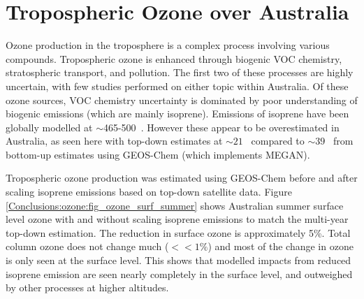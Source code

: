 \section{Tropospheric Ozone over Australia}
\label{Conclusions:ozone}
  
  Ozone production in the troposphere is a complex process involving various compounds.
  Tropospheric ozone is enhanced through biogenic VOC chemistry, stratospheric transport, and pollution.
  The first two of these processes are highly uncertain, with few studies performed on either topic within Australia.
  Of these ozone sources, VOC chemistry uncertainty is dominated by poor understanding of biogenic emissions (which are mainly isoprene).
  Emissions of isoprene have been globally modelled at $\sim$465-500\tgcpyr ~\parencite{Guenther2006, Messina2016}. 
  However these appear to be overestimated in Australia, as seen here with top-down estimates at $\sim 21$ \tgcpyr ~compared to $\sim 39$ \tgcpyr ~from bottom-up estimates using GEOS-Chem (which implements MEGAN).
  
  
  Tropospheric ozone production was estimated using GEOS-Chem before and after scaling isoprene emissions based on top-down satellite data.
  Figure \ref{Conclusions:ozone:fig_ozone_surf_summer} shows Australian summer surface level ozone with and without scaling isoprene emissions to match the multi-year top-down estimation.
  The reduction in surface ozone is approximately 5\%.
  Total column ozone does not change much ($<<1\%$) and most of the change in ozone is only seen at the surface level.
  This shows that modelled impacts from reduced isoprene emission are seen nearly completely in the surface level, and outweighed by other processes at higher altitudes.
  
  
